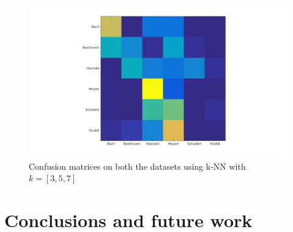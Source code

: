 \documentclass[a4paper]{article}
\begin{document}
	\begin{figure}[!h]
		\centering
		\label{fig:cm}
		\includegraphics[scale=0.3]{misc/CM_st_7.png}
		\caption{Confusion matrices on both the datasets using k-NN with $k = \left[3,5,7\right]$}
	\end{figure}
	
	\section{Conclusions and future work}
	\lipsum[1-3]
	
\end{document}
